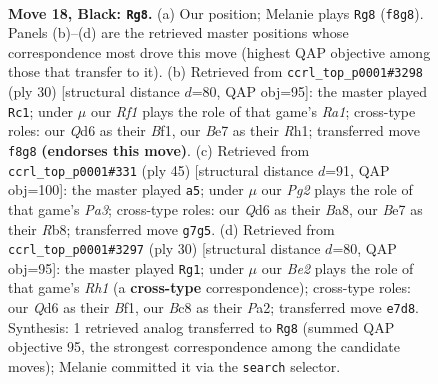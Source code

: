 \documentclass[11pt]{article}
\begin{document}
\begin{figure}[p]
\label{fig:thought-m33}
\end{figure}

\clearpage

\begin{figure}[p]\centering
\begin{subfigure}{0.46\textwidth}\centering
\resizebox{\linewidth}{!}{%
\newchessgame
\chessboard[
  setfen={r1b1kr2/p3b1pp/1pnq4/3p1p1n/Pp1P3P/4PNPB/R3QP2/1NBR2K1 b - - 0 18},
  showmover=false,
  pgfstyle=straightmove, color=movearrow, markmove={f8-g8}
]}
\caption{}
\end{subfigure}\hfill
\begin{subfigure}{0.46\textwidth}\centering
\resizebox{\linewidth}{!}{%
\newchessgame
\chessboard[
  setfen={r1br2k1/p3qpb1/1pn2np1/2p4p/2P1PN1P/2N1BP2/PP3Q2/R3KB1R w KQ - 0 16},
  showmover=false,
  pgfstyle=straightmove, color=movearrow, markmove={a1-c1}
]}
\caption{}
\end{subfigure}
\\[4pt]
\begin{subfigure}{0.46\textwidth}\centering
\resizebox{\linewidth}{!}{%
\newchessgame
\chessboard[
  setfen={br1qrbk1/5pp1/p2p1n1p/3Pp3/1PR1P3/5N1P/1B3PP1/1B1QR1K1 b - - 0 23},
  showmover=false,
  pgfstyle=straightmove, color=movearrow, markmove={a6-a5}
]}
\caption{}
\end{subfigure}\hfill
\begin{subfigure}{0.46\textwidth}\centering
\resizebox{\linewidth}{!}{%
\newchessgame
\chessboard[
  setfen={r1br2k1/p3qpb1/1pn2np1/2p4p/2P1PN1P/2N1BP2/PP3Q2/R3KB1R w KQ - 0 16},
  showmover=false,
  pgfstyle=straightmove, color=movearrow, markmove={h1-g1}
]}
\caption{}
\end{subfigure}
\caption{\textbf{Move 18, Black: \texttt{Rg8}.} (a) Our position; Melanie plays \texttt{Rg8} (\texttt{f8g8}). Panels (b)--(d) are the retrieved master positions whose correspondence most drove this move (highest QAP objective among those that transfer to it). (b) Retrieved from \texttt{ccrl\_top\_p0001\#3298} (ply 30) [structural distance $d$=80, QAP obj=95]: the master played \texttt{Rc1}; under $\mu$ our \emph{Rf1} plays the role of that game's \emph{Ra1}; cross-type roles: our \emph{Q}d6 as their \emph{B}f1, our \emph{B}e7 as their \emph{R}h1; transferred move \texttt{f8g8} \textbf{(endorses this move)}. (c) Retrieved from \texttt{ccrl\_top\_p0001\#331} (ply 45) [structural distance $d$=91, QAP obj=100]: the master played \texttt{a5}; under $\mu$ our \emph{Pg2} plays the role of that game's \emph{Pa3}; cross-type roles: our \emph{Q}d6 as their \emph{B}a8, our \emph{B}e7 as their \emph{R}b8; transferred move \texttt{g7g5}. (d) Retrieved from \texttt{ccrl\_top\_p0001\#3297} (ply 30) [structural distance $d$=80, QAP obj=95]: the master played \texttt{Rg1}; under $\mu$ our \emph{Be2} plays the role of that game's \emph{Rh1} (a \textbf{cross-type} correspondence); cross-type roles: our \emph{Q}d6 as their \emph{B}f1, our \emph{B}c8 as their \emph{P}a2; transferred move \texttt{e7d8}. Synthesis: 1 retrieved analog transferred to \texttt{Rg8} (summed QAP objective 95, the strongest correspondence among the candidate moves); Melanie committed it via the \texttt{search} selector.}
\label{fig:thought-m35}
\end{figure}
\end{document}
